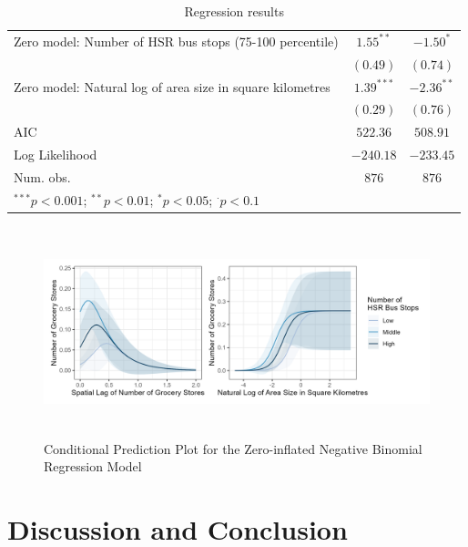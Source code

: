 \documentclass[preprint, 3p,
authoryear]{elsarticle} %
\begin{document}
\begin{table}
\begin{center}
\begin{footnotesize}
\begin{tabular}{l c c}
Zero model: Number of HSR bus stops (75-100 percentile)                       & $1.55^{**}$  & $-1.50^{*}$     \\
                                                                              & $(0.49)$     & $(0.74)$        \\
Zero model: Natural log of area size in square kilometres                     & $1.39^{***}$ & $-2.36^{**}$    \\
                                                                              & $(0.29)$     & $(0.76)$        \\
\hline
AIC                                                                           & $522.36$     & $508.91$        \\
Log Likelihood                                                                & $-240.18$    & $-233.45$       \\
Num. obs.                                                                     & $876$        & $876$           \\
\hline
\multicolumn{3}{l}{\tiny{$^{***}p<0.001$; $^{**}p<0.01$; $^{*}p<0.05$; $^{\cdot}p<0.1$}}
\end{tabular}
\end{footnotesize}
\caption{Regression results}
\label{tab:regression_results}
\end{center}
\end{table}

\begin{figure}

{\centering \includegraphics[width=6.4in,height=2.4in]{./images/margin} 

}

\caption{\label{fig:margin}Conditional Prediction Plot for the Zero-inflated Negative Binomial Regression Model}\label{fig:unnamed-chunk-18}
\end{figure}

\section{Discussion and Conclusion}\label{discussion-and-conclusion}

\renewcommand\refname{References}

\end{document}
